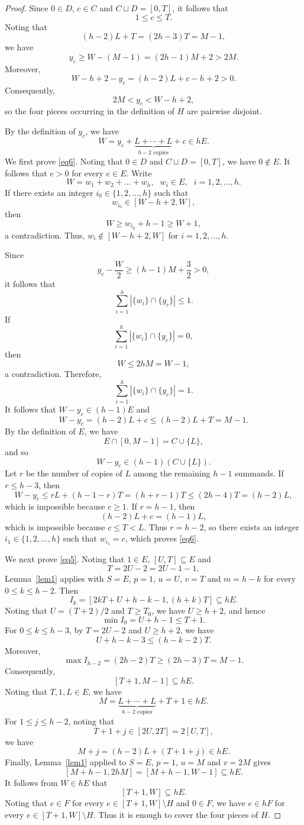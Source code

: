 \documentclass[10pt,a4paper]{amsart}
\begin{document}
\begin{proof}
Since $0\in D$, $c\in C$ and $C\sqcup D=[0,T]$, it follows that
\[
 1\le c\le T.
\]
Noting that
\[
 (h-2)L+T=(2h-3)T=M-1,
\]
we have
\[
 y_c\ge W-(M-1)=(2h-1)M+2>2M.
\]
Moreover,
\[
 W-h+2-y_c=(h-2)L+c-h+2>0.
\]
Consequently,
\[
 2M<y_c<W-h+2,
\]
so the four pieces occurring in the definition of $H$ are pairwise disjoint.

By the definition of $y_c$, we have
\[
 W=y_c+\underbrace{L+\cdots+L}_{h-2\text{ copies}}+c\in hE.
\]
We first prove \eqref{eq6}. Noting that $0\in D$ and $C\sqcup D=[0,T]$, we have $0\notin E$. It follows that $e>0$ for every $e\in E$. Write
\[W=w_1+w_2+\ldots+w_h,~~~ w_i\in E,~~~i=1,2,\ldots,h.
\]
If there exists an integer $i_0\in\{1,2,\ldots,h\}$ such that
\[
 w_{i_0}\in[W-h+2,W],
\]
then 
\[
 W\ge w_{i_0}+h-1\ge W+1,
\]
a contradiction. Thus, $w_i\not\in [W-h+2,W]$ for $i=1,2,\ldots,h$.

Since
\[
 y_c-\frac W2\ge (h-1)M+\frac32>0,
\]
it follows that
\[
\sum\limits_{i=1}^{h}|\{w_i\}\cap\{y_c\}|\leq 1.
\] 
If \[
\sum\limits_{i=1}^{h}|\{w_i\}\cap\{y_c\}|=0,
\] 
then 
\[
 W\le 2hM=W-1,
\]
a contradiction. Therefore,
\[
\sum\limits_{i=1}^{h}|\{w_i\}\cap\{y_c\}|=1.
\] 
It follows that $W-y_c\in (h-1)E$ and
\[
 W-y_c=(h-2)L+c\le(h-2)L+T=M-1.
\]
By the definition of $E$, we have
\[
 E\cap[0,M-1]=C\cup\{L\},
\]
and so \[
W-y_c\in (h-1)(C\cup\{L\}).
\] 
Let $r$ be the number of copies of $L$ among the remaining $h-1$ summands. If $r\le h-3$, then
\[
W-y_c\leq rL+(h-1-r)T=(h+r-1)T\le(2h-4)T=(h-2)L,
\]
which is impossible because $c\ge1$. If $r=h-1$, then
\[
 (h-2)L+c=(h-1)L,
\]
which is impossible because $c\le T<L$. Thus $r=h-2$, so there exists an integer $i_1\in\{1,2,\ldots,h\}$ such that $w_{i_1}=c$, which proves \eqref{eq6}.

We next prove \eqref{eq5}. Noting that $1\in E$, $[U,T]\subseteq E$ and 
\[
 T=2U-2=2U-1-1,
\]
Lemma~\ref{lem1} applies with $S=E$, $p=1$, $u=U$, $v=T$ and $m=h-k$ for every $0\le k\le h-2$.
Then
\[
 I_k=[2kT+U+h-k-1,(h+k)T]\subseteq hE.
\]
Noting that $U=(T+2)/2$ and $T\ge T_0$, we have $U\ge h+2$, and hence
\[
 \min I_0=U+h-1\le T+1.
\]
For $0\le k\le h-3$, by $T=2U-2$ and $U\ge h+2$, we have
\[
 U+h-k-3\le(h-k-2)T.
\]
Moreover,
\[
 \max I_{h-2}=(2h-2)T\ge(2h-3)T=M-1.
\]
Consequently,
\[
 [T+1,M-1]\subseteq hE.
\]
Noting that $T,1,L\in E$, we have
\[
 M=\underbrace{L+\cdots+L}_{h-2\text{ copies}}+T+1\in hE.
\]
For $1\le j\le h-2$, noting that
\[
 T+1+j\in[2U,2T]=2[U,T],
\]
we have
\[
 M+j=(h-2)L+(T+1+j)\in hE.
\]
Finally, Lemma~\ref{lem1} applied to $S=E$, $p=1$, $u=M$ and $v=2M$ gives
\[
 [M+h-1,2hM]=[M+h-1,W-1]\subseteq hE.
\]
It follows from $W\in hE$ that
\[
 [T+1,W]\subseteq hE.
\]
Noting that $e\in F$ for every $e\in [T+1,W]\setminus H$ and $0\in F$, we have $e\in hF$ for every $e\in [T+1,W]\setminus H$. Thus it is enough to cover the four pieces of $H$.


\end{proof}
\end{document}
